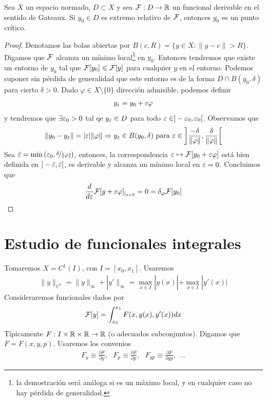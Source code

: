 \begin{prop}
    Sea $X$ un espacio normado, $D\subset X$ y sea $\mathcal{F}:D \to \mathbb{R}$ un funcional derivable en el sentido de Gateaux. Si $y_0\in D$ es extremo relativo de $\mathcal{F}$, entonces $y_0$ es un punto crítico.

    \begin{proof}
        Denotamos las bolas abiertas por $B(c,R)=\{y\in X : \|y-c\| > R\}$. Digamos que $\mathcal{F}$ alcanza un mínimo local\footnote{la demostración será análoga si es un máximo local, y en cualquier caso no hay pérdida de generalidad.} en $y_0$. Entonces tendremos que existe un entorno de $y_0$ tal que $\mathcal{F}[y_0] \leqslant \mathcal{F}[y]$ para cualquier $y$ en el entorno. Podemos suponer sin pérdida de generalidad que este entorno es de la forma $D\cap B(y_0, \delta)$ para cierto $\delta>0$. Dado $\varphi \in X\setminus\{0\}$ dirección admisible, podemos definir
        \begin{gather*}
            y_\varepsilon = y_0 + \varepsilon\varphi
        \end{gather*}
        y tendremos que $\exists \varepsilon_0>0$ tal qe $y_\varepsilon\in D$ para todo $\varepsilon \in ]-\varepsilon_0, \varepsilon_0[$. Observamos que
        \begin{gather*}
            \|y_0 - y_\varepsilon\| = |\varepsilon| \|\varphi\| \Rightarrow y_\varepsilon \in B(y_0, \delta) \text{ para } \varepsilon \in \left] \frac{-\delta}{\|\varphi\|}, \frac{\delta}{\|\varphi\|} \right[
        \end{gather*}
        Sea $\bar{\varepsilon} = \min\left(\varepsilon_0, \nicefrac{\delta}{\|\varphi\|}\right)$, entonces, la correspondencia $\varepsilon \mapsto \mathcal{F}[y_0+\varepsilon\varphi]$ está bien definida en $]-\bar{\varepsilon}, \bar{\varepsilon}[$, es derivable y alcanza un mínimo local en $\varepsilon=0$. Concluimos que 
        \begin{gather*}
            \frac{d}{d \varepsilon} \mathcal{F}[y+\varepsilon\varphi]_{|_{\varepsilon=0}} = 0 = \delta_\varphi\mathcal{F}[y_0]
        \end{gather*}
    \end{proof}
\end{prop}

\section{Estudio de funcionales integrales}

Tomaremos $X=C^1(I)$, con $I=[x_0, x_1]$. Usaremos
\begin{gather*}
    \|y\|_{C^1} = \|y\|_\infty + |y'\|_\infty = \max_{x\in I}|y(x)| + \max_{x\in I}|y'(x)|
\end{gather*}
Consideraremos funcionales dados por 
\begin{gather*}
    \mathcal{F}[y] = \int_{x_0}^{x_1} F(x, y(x), y'(x)) dx
\end{gather*}
Típicamente $F:I \times \mathbb{R} \times \mathbb{R} \to \mathbb{R}$ (o adecuados subconjuntos). Digamos que $F=F(x,y,p)$.
Usaremos los convenios
\begin{gather*}
    F_y \equiv \frac{\partial F}{\partial y},\ \ \ F_p \equiv \frac{\partial F}{\partial p},\ \ \ F_{yp} \equiv \frac{\partial F}{\partial yp},\ \ ... 
\end{gather*}

